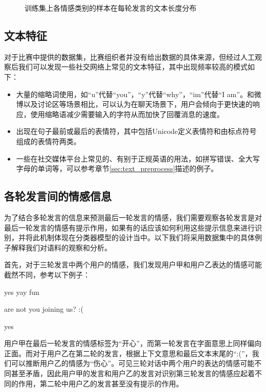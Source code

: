 \begin{figure}[h]
  \caption{训练集上各情感类别的样本在每轮发言的文本长度分布}

  \label{fig:context_emo_train_class_len}
\end{figure}

\subsection{文本特征}
\label{ssec:exp_context_emo_data_text}

对于比赛中提供的数据集，比赛组织者并没有给出数据的具体来源，但经过人工观察后我们可以发现一些社交网络上常见的文本特征，其中出现频率较高的模式如下：

\begin{itemize}

\item 大量的缩略词使用，如“u”代替“you”，“y”代替“why”，“im”代替“I am”。和微博以及讨论区等场景相比，可以认为在聊天场景下，用户会倾向于更快速的响应，使用缩略语减少需要输入的字符从而加快了回覆消息的速度。

\item 出现在句子最前或最后的表情符，其中包括Unicode定义表情符和由标点符号组成的表情符两类。

\item 一些在社交媒体平台上常见的、有别于正规英语的用法，如拼写错误、全大写字母的单词等，可以参考章节\ref{sec:text_preprocess}描述的例子。

\end{itemize}

\subsection{各轮发言间的情感信息}
\label{ssec:exp_context_emo_multi_turn_analyse}

为了结合多轮发言的信息来预测最后一轮发言的情感，我们需要观察各轮发言是对最后一轮发言的情感有提示作用，如果有的话应该如何利用这些提示信息来进行识别，并将此机制体现在分类器模型的设计当中。以下我们将采用数据集中的具体例子解释我们对语料的观察和分析。

首先，对于三轮发言中两个用户的情感，我们发现用户甲和用户乙表达的情感可能截然不同，参考以下例子：

 yes yay fun\par
{} are not you joining us? :( \par
{} yes\par

用户甲在最后一轮发言的情感标签为“开心”，而第一轮发言在字面意思上同样偏向正面。而对于用户乙在第二轮的发言，根据上下文意思和最后文本末尾的“:(”，我们可以推断用户乙的情感为“伤心”。可见三轮对话中两个用户的表达的情感可能不同甚至矛盾，因此用户甲的发言和用户乙的发言对识别第三轮发言的情感应起着不同的作用，第二轮中用户乙的发言甚至没有提示的作用。

